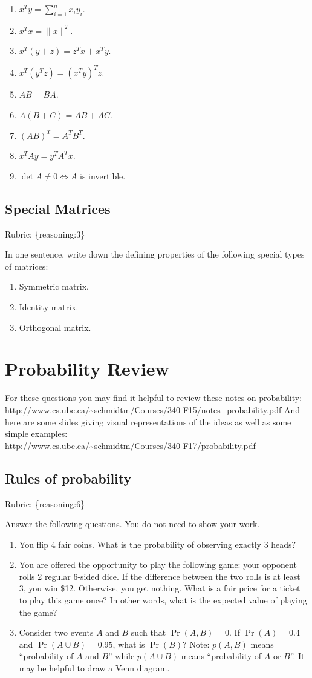 \documentclass{article}
\def\rubric#1{\gre{Rubric: \{#1\}}}{}
\def\blu#1{{\color{blu}#1}}
\def\gre#1{{\color{gre}#1}}
\def\red#1{{\color{red}#1}}
\def\norm#1{\|#1\|}
\def\enum#1{\begin{enumerate}#1\end{enumerate}}
\begin{document}
\begin{enumerate}
\item $x^Ty = \sum_{i=1}^n x_iy_i$.
\item $x^Tx = \norm{x}^2$.
\item $x^T(y+z) = z^Tx + x^Ty$.
\item $x^T(y^Tz) = (x^Ty)^Tz$.
\item $AB=BA$.
\item $A(B + C) = AB + AC$.
\item $(AB)^T = A^TB^T$.
\item $x^TAy = y^TA^Tx$.
\item $\det A \neq 0 \iff A$ is invertible.
\end{enumerate}

\subsection{Special Matrices}
\rubric{reasoning:3}

\blu{In one sentence, write down the defining properties of the following special types of matrices}:
\enum{
\item Symmetric matrix.
\item Identity matrix.
\item Orthogonal matrix.
}

\section{Probability Review}


For these questions you may find it helpful to review these notes on probability:\\
\url{http://www.cs.ubc.ca/~schmidtm/Courses/340-F15/notes_probability.pdf}
And here are some slides giving visual representations of the ideas as well as some simple examples:\\
\url{http://www.cs.ubc.ca/~schmidtm/Courses/340-F17/probability.pdf}

\subsection{Rules of probability}
\rubric{reasoning:6}

\blu{Answer the following questions.} You do not need to show your work.

\begin{enumerate}
\item You flip 4 fair coins. What is the probability of observing \red{exactly} 3 heads?
\item You are offered the opportunity to play the following game: your opponent rolls 2 regular 6-sided dice. If the difference between the two rolls is at least 3, you win \$12. Otherwise, you get nothing. What is a fair price for a ticket to play this game once? In other words, what is the expected value of playing the game?
\item Consider two events $A$ and $B$ such that $\Pr(A, B)=0$. If $\Pr(A) = 0.4$ and $\Pr(A \cup B) = 0.95$, what is $\Pr(B)$? Note: $p(A, B)$ means
``probability of $A$ and $B$'' while $p(A \cup B)$ means ``probability of $A$ or $B$''. It may be helpful to draw a Venn diagram.
\end{enumerate}
\end{document}
